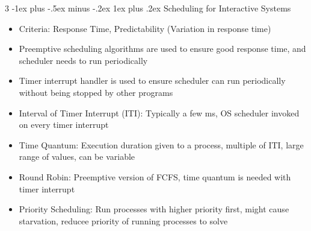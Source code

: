 \documentclass[10pt, landscape]{article}
\makeatletter
\renewcommand{\subsection}{\@startsection{subsection}{3}{0mm}%
                                {-1ex plus -.5ex minus -.2ex}%
                                {1ex plus .2ex}%
                                {\normalfont\small\bfseries}}%
\makeatother
\begin{document}
\begin{multicols*}{3}
\subsection{Scheduling for Interactive Systems}
\begin{itemize}
    \item Criteria: Response Time, Predictability (Variation in response time)
    \item Preemptive scheduling algorithms are used to ensure good response time, and scheduler needs to run periodically
    \item Timer interrupt handler is used to ensure scheduler can run periodically without being stopped by other programs
    \item Interval of Timer Interrupt (ITI): Typically a few ms, OS scheduler invoked on every timer interrupt
    \item Time Quantum: Execution duration given to a process, multiple of ITI, large range of values, can be variable
    \item Round Robin: Preemptive version of FCFS, time quantum is needed with timer interrupt
    \item Priority Scheduling: Run processes with higher priority first, might cause starvation, reducee priority of running processes to solve

\end{itemize}
\end{multicols*}
\end{document}
